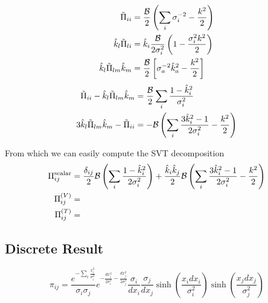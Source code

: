 \documentclass{revtex4}
\begin{document}
\begin{subequations}
\begin{align}
  \tilde{\Pi}_{ii} &= \frac{\mathcal{B}}{2}\left(\sum_i\sigma_i^{-2} - \frac{k^2}{2}\right) \\
  \hat{k}_l\tilde{\Pi}_{li} &= \hat{k}_i\frac{\mathcal{B}}{2\sigma_i^2}\left(1-\frac{\sigma_i^2k^2}{2}\right) \\
  \hat{k}_l\tilde{\Pi}_{lm}\hat{k}_m &= \frac{\mathcal{B}}{2}\left[\sigma_a^{-2}\hat{k}_a^2 -\frac{k^2}{2}\right] 
\end{align}
\end{subequations}
\begin{align}
  \tilde{\Pi}_{ii} - \hat{k}_l\tilde{\Pi}_{lm}\hat{k}_m &= \frac{\mathcal{B}}{2}\sum_i\frac{1-\hat{k}_i^2}{\sigma_i^2}\\
  3\hat{k}_l\tilde{\Pi}_{lm}\hat{k}_m - \tilde{\Pi}_{ii} &= -\mathcal{B}\left(\sum_i\frac{3\hat{k}_i^2-1}{2\sigma_i^2} - \frac{k^2}{2}\right)
\end{align}

From which we can easily compute the SVT decomposition
\begin{subequations}
  \begin{align}
    \Pi_{ij}^{\rm scalar} &= \frac{\delta_{ij}}{2}\mathcal{B}\left(\sum_i\frac{1-\hat{k}_i^2}{2\sigma_i^2} \right) + \frac{\hat{k}_i\hat{k}_j}{2}\mathcal{B}\left(\sum_i\frac{3\hat{k}_i^2-1}{2\sigma_i^2}-\frac{k^2}{2}\right)\\
    \Pi_{ij}^{(V)} &= \\
    \Pi_{ij}^{(T)} &=
  \end{align}
\end{subequations}


\subsection{Discrete Result}
\begin{equation}
  \pi_{ij} = \frac{e^{-\sum_i\frac{x_i^2}{\sigma_i^2}}}{\sigma_i\sigma_j}e^{-\frac{dx_i^2}{2\sigma_i^2}-\frac{dx_j^2}{2\sigma_j^2}}\frac{\sigma_i}{dx_i}\frac{\sigma_j}{dx_j}\sinh\left(\frac{x_idx_i}{\sigma_i^2}\right)\sinh\left(\frac{x_jdx_j}{\sigma_j^2}\right)
\end{equation}
\end{document}
